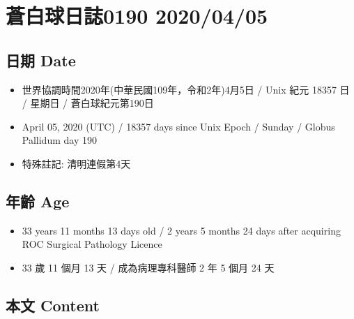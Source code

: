 \documentclass[a5paper, 12pt
]{book}
\providecommand{\tightlist}{%
  \setlength{\itemsep}{0pt}\setlength{\parskip}{0pt}}
\begin{document}
\hypertarget{ux84bcux767dux7403ux65e5ux8a8c0190-20200405}{%
\section{蒼白球日誌0190
2020/04/05}\label{ux84bcux767dux7403ux65e5ux8a8c0190-20200405}}

\hypertarget{ux65e5ux671f-date-35}{%
\subsection{日期 Date}\label{ux65e5ux671f-date-35}}

\begin{itemize}
\tightlist
\item
  世界協調時間2020年(中華民國109年，令和2年)4月5日 / Unix 紀元 18357 日
  / 星期日 / 蒼白球紀元第190日
\item
  April 05, 2020 (UTC) / 18357 days since Unix Epoch / Sunday / Globus
  Pallidum day 190
\item
  特殊註記: 清明連假第4天
\end{itemize}

\hypertarget{ux5e74ux9f61-age-35}{%
\subsection{年齡 Age}\label{ux5e74ux9f61-age-35}}

\begin{itemize}
\tightlist
\item
  33 years 11 months 13 days old / 2 years 5 months 24 days after
  acquiring ROC Surgical Pathology Licence
\item
  33 歲 11 個月 13 天 / 成為病理專科醫師 2 年 5 個月 24 天
\end{itemize}

\hypertarget{ux672cux6587-content-35}{%
\subsection{本文 Content}\label{ux672cux6587-content-35}}
\end{document}

